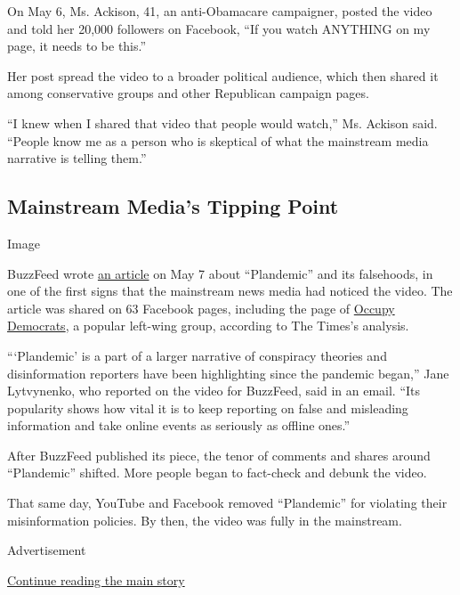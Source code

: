 On May 6, Ms. Ackison, 41, an anti-Obamacare campaigner, posted the
video and told her 20,000 followers on Facebook, ``If you watch ANYTHING
on my page, it needs to be this.''

Her post spread the video to a broader political audience, which then
shared it among conservative groups and other Republican campaign pages.

``I knew when I shared that video that people would watch,'' Ms. Ackison
said. ``People know me as a person who is skeptical of what the
mainstream media narrative is telling them.''

\hypertarget{mainstream-medias-tipping-point}{%
\subsection{Mainstream Media's Tipping
Point}\label{mainstream-medias-tipping-point}}

Image

BuzzFeed wrote
\href{https://www.buzzfeednews.com/article/janelytvynenko/coronavirus-plandemic-viral-harmful-fauci-mikovits?utm_source=dynamic\&utm_campaign=bffbbuzzfeedscience\&ref=bffbbuzzfeedscience\&fbclid=IwAR1n7O_S9Y3xabxOgcn2-KRQPWBWUsO5GgR3WmZp-JQhRIFBRtXCg-fn1uY}{an
article} on May 7 about ``Plandemic'' and its falsehoods, in one of the
first signs that the mainstream news media had noticed the video. The
article was shared on 63 Facebook pages, including the page of
\href{https://www.nytimes3xbfgragh.onion/2020/05/18/us/politics/occupy-democrats-facebook.html}{Occupy
Democrats}, a popular left-wing group, according to The Times's
analysis.

```Plandemic' is a part of a larger narrative of conspiracy theories and
disinformation reporters have been highlighting since the pandemic
began,'' Jane Lytvynenko, who reported on the video for BuzzFeed, said
in an email. ``Its popularity shows how vital it is to keep reporting on
false and misleading information and take online events as seriously as
offline ones.''

After BuzzFeed published its piece, the tenor of comments and shares
around ``Plandemic'' shifted. More people began to fact-check and debunk
the video.

That same day, YouTube and Facebook removed ``Plandemic'' for violating
their misinformation policies. By then, the video was fully in the
mainstream.

Advertisement

\protect\hyperlink{after-bottom}{Continue reading the main story}

